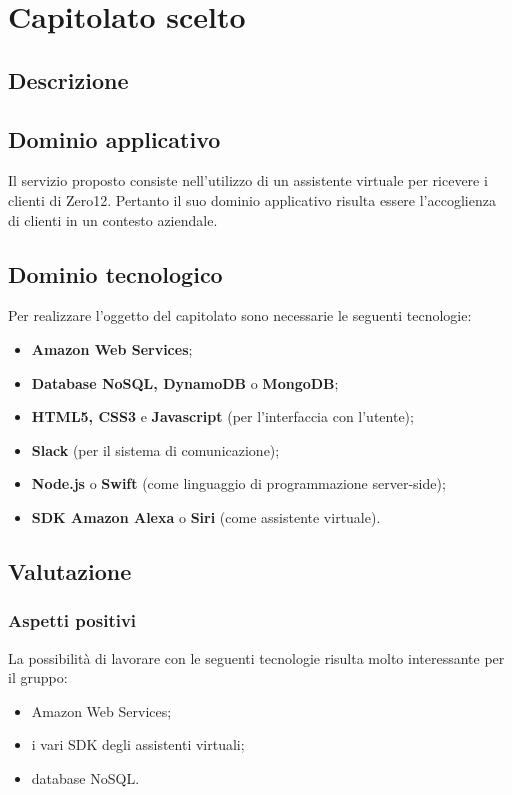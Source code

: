 \section {Capitolato scelto}
	\subsection {Descrizione}
		\SCOPO
	\subsection {Dominio applicativo}
Il servizio proposto consiste nell'utilizzo di un assistente virtuale per ricevere i clienti di Zero12. Pertanto il suo dominio applicativo risulta essere l'accoglienza di clienti in un contesto aziendale.
	\subsection {Dominio tecnologico}
		Per realizzare l'oggetto del capitolato sono necessarie le seguenti tecnologie:
		\begin {itemize}
			\item \textbf{Amazon Web Services};
			\item \textbf{Database NoSQL, DynamoDB} o \textbf{MongoDB};
			\item \textbf{HTML5, CSS3} e \textbf{Javascript} (per l'interfaccia con l'utente);
			\item \textbf{Slack} (per il sistema di comunicazione);
			\item \textbf{Node.js} o \textbf{Swift} (come linguaggio di programmazione
 server-side);
 			\item \textbf{SDK Amazon Alexa} o \textbf{Siri} (come assistente virtuale).

		\end {itemize}
	\subsection {Valutazione}
		\subsubsection {Aspetti positivi}
			 La possibilità di lavorare con le seguenti tecnologie risulta molto interessante per il gruppo:
				 \begin {itemize}
				 	\item Amazon Web Services;
				 	\item i vari SDK degli assistenti virtuali;
				 	\item database NoSQL.
				 \end {itemize}
